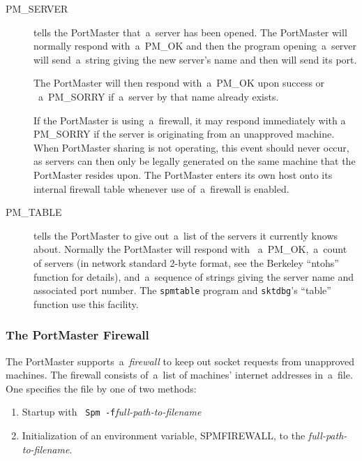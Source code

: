 \documentclass[12pt]{article}
\begin{document}
\begin{description}
  \item[{\small PM\_SERVER}] tells the PortMaster that~a~server has been
       opened.  The PortMaster will normally respond with~a~{\small PM\_OK}
       and then the program opening~a~server will send~a~string giving the
       new server's name and then will send its port.
     
       The PortMaster will then respond with~a~{\small PM\_OK} upon success or
      ~a~{\small PM\_SORRY} if~a~server by that name already exists.
     
       If the PortMaster is using~a~firewall, it may respond immediately with a
       {\small PM\_SORRY} if the server is originating from an unapproved machine.
       When PortMaster sharing is not operating, this event should never occur, as
       servers can then only be legally generated on the same machine that the
       PortMaster resides upon.  The PortMaster enters its own host onto its
       internal firewall table whenever use of~a~firewall is enabled.

  \item[{\small PM\_TABLE}] tells the PortMaster to give out~a~list of the
       servers it currently knows about.  Normally the PortMaster will respond with
      ~a~{\small PM\_OK},~a~count of servers (in network standard 2-byte format,
       see the Berkeley ``ntohs'' function for details), and~a~sequence of strings
       giving the server name and associated port number.  The \verb`spmtable`
       program and \verb`sktdbg`'s ``table'' function use this facility.

\end{description}

\subsubsection{The PortMaster Firewall}

The PortMaster supports~a~{\em firewall} to keep out socket requests from
unapproved machines.  The firewall consists of~a~list of machines' internet
addresses in~a~file.  One specifies the file by one of two methods:

 \begin{enumerate}
  \item Startup with \verb# Spm -f#{\em full-path-to-filename}
  \item Initialization of an environment variable, {\small SPMFIREWALL},
        to the {\em full-path-to-filename}.
 \end{enumerate}
\end{document}

